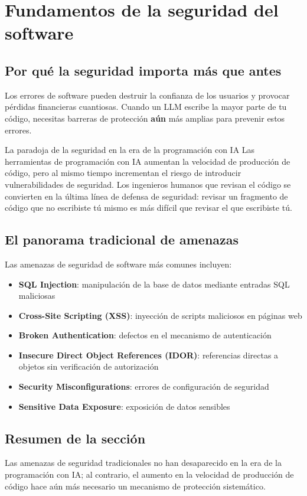 \section{Fundamentos de la seguridad del software}

\subsection{Por qué la seguridad importa más que antes}

Los errores de software pueden destruir la confianza de los usuarios y provocar pérdidas financieras cuantiosas. Cuando un LLM escribe la mayor parte de tu código, necesitas barreras de protección \textbf{aún} más amplias para prevenir estos errores.

\begin{importantbox}{La paradoja de la seguridad en la era de la programación con IA}
Las herramientas de programación con IA aumentan la velocidad de producción de código, pero al mismo tiempo incrementan el riesgo de introducir vulnerabilidades de seguridad. Los ingenieros humanos que revisan el código se convierten en la última línea de defensa de seguridad: revisar un fragmento de código que no escribiste tú mismo es más difícil que revisar el que escribiste tú.
\end{importantbox}

\subsection{El panorama tradicional de amenazas}

Las amenazas de seguridad de software más comunes incluyen:
\begin{itemize}
    \item \textbf{SQL Injection}: manipulación de la base de datos mediante entradas SQL maliciosas
    \item \textbf{Cross-Site Scripting (XSS)}: inyección de scripts maliciosos en páginas web
    \item \textbf{Broken Authentication}: defectos en el mecanismo de autenticación
    \item \textbf{Insecure Direct Object References (IDOR)}: referencias directas a objetos sin verificación de autorización
    \item \textbf{Security Misconfigurations}: errores de configuración de seguridad
    \item \textbf{Sensitive Data Exposure}: exposición de datos sensibles
\end{itemize}

\subsection{Resumen de la sección}

Las amenazas de seguridad tradicionales no han desaparecido en la era de la programación con IA; al contrario, el aumento en la velocidad de producción de código hace aún más necesario un mecanismo de protección sistemático.

